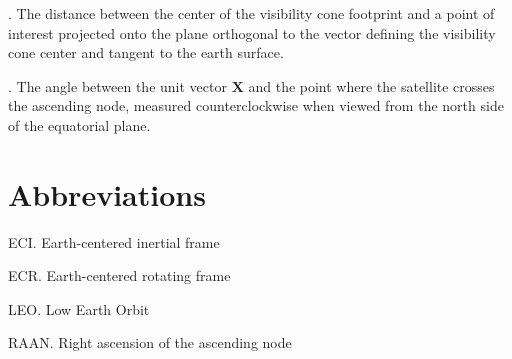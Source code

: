 \documentclass[oneside,12pt]{report}
\begin{document}
\vspace{8pt} . The distance between the center of the visibility cone footprint and a point of interest projected onto the plane orthogonal to the vector defining the visibility cone center and tangent to the earth surface.

\vspace{8pt}
. The angle
between the unit vector $\bm{X}$ and the point where the satellite crosses the
ascending node, measured counterclockwise when viewed from the north side of
the equatorial plane.


\chapter{Abbreviations}\label{Abbreviations}


\noindent ECI.  Earth-centered inertial frame

\vspace{5pt}

\noindent ECR.  Earth-centered rotating frame

\vspace{5pt}

\noindent LEO.  Low Earth Orbit  

\vspace{5pt}

\noindent RAAN. Right ascension of the ascending node

\vspace{5pt}




\renewcommand\bibname{Selected Bibliography Including Cited Works}
\nocite{*}  %

\end{document}
